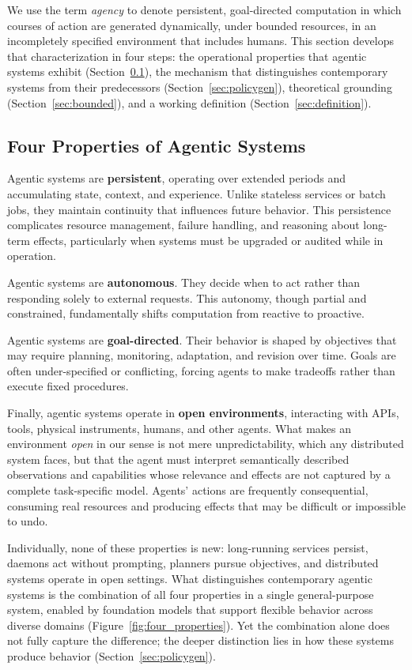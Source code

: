 \documentclass[11pt]{article}
\begin{document}
We use the term \textit{agency} to denote persistent, goal-directed computation in which courses of action are generated dynamically, under bounded resources, in an incompletely specified environment that includes humans. This section develops that characterization in four steps: the operational properties that agentic systems exhibit (Section~\ref{sec:properties}), the mechanism that distinguishes contemporary systems from their predecessors (Section~\ref{sec:policygen}), theoretical grounding (Section~\ref{sec:bounded}), and a working definition (Section~\ref{sec:definition}).

\subsection{Four Properties of Agentic Systems}
\label{sec:properties}

Agentic systems are \textbf{persistent}, operating over extended periods and accumulating state, context, and experience. Unlike stateless services or batch jobs, they maintain continuity that influences future behavior. This persistence complicates resource management, failure handling, and reasoning about long-term effects, particularly when systems must be upgraded or audited while in operation.

Agentic systems are \textbf{autonomous}. They decide when to act rather than responding solely to external requests. This autonomy, though partial and constrained, fundamentally shifts computation from reactive to proactive.

Agentic systems are \textbf{goal-directed}. Their behavior is shaped by objectives that may require planning, monitoring, adaptation, and revision over time. Goals are often under-specified or conflicting, forcing agents to make tradeoffs rather than execute fixed procedures.

Finally, agentic systems operate in \textbf{open environments}, interacting with APIs, tools, physical instruments, humans, and other agents. What makes an environment \textit{open} in our sense is not mere unpredictability, which any distributed system faces, but that the agent must interpret semantically described observations and capabilities whose relevance and effects are not captured by a complete task-specific model. Agents' actions are frequently consequential, consuming real resources and producing effects that may be difficult or impossible to undo.

Individually, none of these properties is new: long-running services persist, daemons act without prompting, planners pursue objectives, and distributed systems operate in open settings. What distinguishes contemporary agentic systems is the combination of all four properties in a single general-purpose system, enabled by foundation models that support flexible behavior across diverse domains (Figure~\ref{fig:four_properties}). Yet the combination alone does not fully capture the difference; the deeper distinction lies in how these systems produce behavior (Section~\ref{sec:policygen}).
\end{document}
